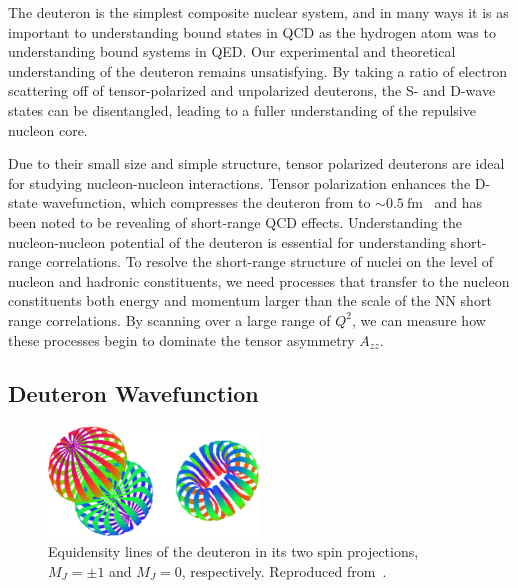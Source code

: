 
The deuteron is the simplest composite nuclear system, and in many ways it is as important to understanding bound states in QCD as the hydrogen atom was to understanding bound systems in QED.  Our experimental and theoretical understanding of the deuteron remains unsatisfying. By taking a ratio of electron scattering off of tensor-polarized and unpolarized deuterons, the S- and D-wave states can be disentangled, leading to a fuller understanding of the repulsive nucleon core. 

Due to their small size and simple structure, tensor polarized deuterons are ideal for studying nucleon-nucleon interactions. Tensor polarization enhances the D-state wavefunction, which compresses the deuteron from to $\sim0.5\mathrm{~fm}$~\cite{Forest:1996kp} and has been noted to be revealing of short-range QCD effects. Understanding the nucleon-nucleon potential of the deuteron is essential for understanding short-range correlations. To resolve the short-range structure of nuclei on the level of nucleon and hadronic constituents, we need processes that transfer to the nucleon constituents both energy and momentum larger than the scale of the NN short range correlations. By scanning over a large range of $Q^2$, we can measure how these processes begin to dominate the tensor asymmetry $A_{zz}$.




\subsection{Deuteron Wavefunction}

\begin{figure}
\centering
\includegraphics[width=0.5\textwidth]{figs/deuteron_states.eps}
\caption{\label{fig:deuteron}
Equidensity lines of the deuteron in its two spin projections, $M_J=\pm 1$ and $M_J=0$, respectively. Reproduced from~\cite{Carlson:1997qn,Forest:1996kp}.
}
\end{figure}

